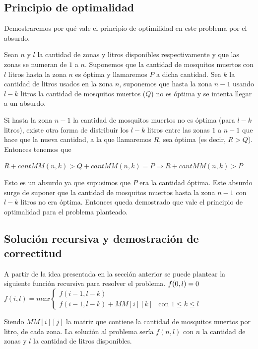 \documentclass[a4paper,10pt] {article}
\begin{document}
\subsection*{Principio de optimalidad}

Demostraremos por qu\'e vale el principio de optimilidad en este problema por el absurdo.

Sean $n$ y $l$ la cantidad de zonas y litros disponibles respectivamente y que las zonas se numeran de $1$ a $n$. Suponemos que la cantidad de mosquitos muertos con $l$ litros hasta la zona $n$ es \'optima y llamaremos $P$ a dicha cantidad. Sea $k$ la cantidad de litros usados en la zona $n$, suponemos que hasta la zona $n-1$ usando $l-k$ litros la cantidad de mosquitos muertos ($Q$) no es \'optima y se intenta llegar a un absurdo.

Si hasta la zona $n-1$ la cantidad de mosquitos muertos no es \'optima (para $l-k$ litros), existe otra forma de distribuir los $l-k$ litros entre las zonas $1$ a $n-1$ que hace que la nueva cantidad, a la que llamaremos $R$, sea \'optima (es decir, $R > Q$). Entonces tenemos que

$R + cantMM(n,k) > Q + cantMM(n,k) = P \Rightarrow R + cantMM(n,k) > P$

Esto es un absurdo ya que supusimos que $P$ era la cantidad \'optima. Este absurdo surge de suponer que la cantidad de mosquitos muertos hasta la zona $n-1$ con $l-k$ litros no era \'optima. Entonces queda demostrado que vale el principio de optimalidad para el problema planteado.

\subsection*{Solución recursiva y demostración de correctitud} %

A partir de la idea presentada en la secci\'on anterior se puede plantear la siguiente funci\'on recursiva para resolver el problema.
$\\ f(0, l) = 0 \\$
$ f(i,l) = max \left\{ \begin{array}{ll}
         f(i-1,l-k) & \mbox{$$}\\
        f(i-1, l-k) + MM[i][k] & \mbox{con $1 \leq k \leq l$}\end{array} \right. $


Siendo $MM[i][j]$ la matriz que contiene la cantidad de mosquitos muertos por litro, de cada zona. La soluci\'on al problema ser\'ia $f(n,l)$ con $n$ la cantidad de zonas y $l$ la cantidad de litros disponibles.
\end{document}
